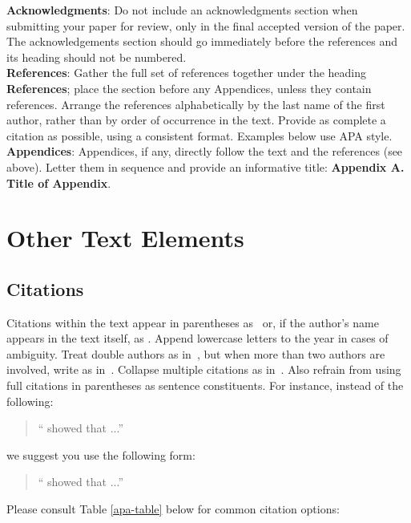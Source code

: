 \documentclass[a4paper,11pt]{article}
\begin{document}
{\bf Acknowledgments}: Do not include an acknowledgments section
when submitting your paper for review, only in the final accepted version of the paper.
The acknowledgements section should go immediately before the references and its heading should not be numbered.\\

\textbf{References}: Gather the full set of references together under
the heading {\bf References}; place the section before any Appendices,
unless they contain references. Arrange the references alphabetically
by the last name of the first author, rather than by order of occurrence in the text.
Provide as complete a citation as possible, using a consistent format. Examples below use APA style.\\

{\bf Appendices}: Appendices, if any, directly follow the text and the
references (see above).  Letter them in sequence and provide an
informative title: {\bf Appendix A. Title of Appendix}.

\section{Other Text Elements}

\subsection{Citations} \label{sec:citations}

Citations within the text appear in parentheses
as~\citep{Gusfield:97} or, if the author's name appears in the text
itself, as \citet{Gusfield:97}.  Append lowercase letters
to the year in cases of ambiguity.  Treat double authors as
in~\citep{Aho:72}, but when more than two
authors are involved, write as in~\citep{Chandra:81}. Collapse multiple citations as
in~\citep{Gusfield:97,Aho:72}. Also refrain from using full citations in parentheses
as sentence constituents. For instance, instead of the following:
\begin{quote}
  ``\citeauthor{Gusfield:97} showed that ...''
\end{quote}
we suggest you use the following form:
\begin{quote}
``\citet{Gusfield:97}  showed that ...''
\end{quote}

Please consult Table \ref{apa-table} below for common citation options:
\end{document}
